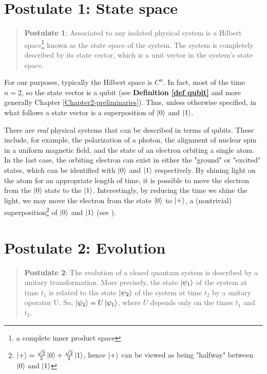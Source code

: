 \section{Postulate 1: State space}


\begin{quote}
    \textbf{Postulate 1}: Associated to any isolated physical system is a Hilbert space\footnote{a complete inner product space} known as the state space of the system. The system is completely described by its state vector, which is a unit vector in the system's state space.
\end{quote}

For our purposes, typically the Hilbert space is $C^n$. In fact, most of the time $n=2$, so the state vector is a qubit (see \textbf{Definition \ref{def qubit}} and more generally Chapter \ref{Chapter2-preliminaries}).  Thus, unless otherwise specified, in what follows a state vector is a superposition of $\ket{0}$ and $\ket{1}$.

There are {\emph{real}} physical systems that can be described in terms of qubits.  These include, for example, the polarization of a photon, the alignment of nuclear spin in a uniform magnetic field, and the state of an electron orbiting a single atom.  In the last case, the orbiting electron can exist in either the "ground" or "excited" states, which can be identified with $\ket{0}$ and $\ket{1}$ respectively. By shining light on the atom for an appropriate length of time, it is possible to move the electron from the $\ket{0}$ state to the $\ket{1}$. Interestingly, by reducing the time we shine the light, we may move the electron from the state $\ket{0}$ to $\ket{+}$, a (nontrivial) superposition\footnote{$\ket{+}=\frac{\sqrt{2}}{2}\ket{0}+\frac{\sqrt{2}}{2}\ket{1}$, hence $\ket{+}$ can be viewed as being "halfway" between $\ket{0}$ and $\ket{1}$} of $\ket{0}$ and $\ket{1}$ (see \cite{Nielsen}).


\pagebreak
\section{Postulate 2: Evolution}

\begin{quote}
    \textbf{Postulate 2}: The evolution of a closed quantum system is described by a unitary transformation. More precisely, the state $\ket{\psi_1}$ of the system at time $t_1$ is related to the state $\ket{\psi_2}$ of the system at time $t_2$ by a unitary operator U.  So, $\ket{\psi_2}=U\ket{\psi_1}$, where $U$ depends only on the times $t_1$ and $t_2$.
\end{quote}

